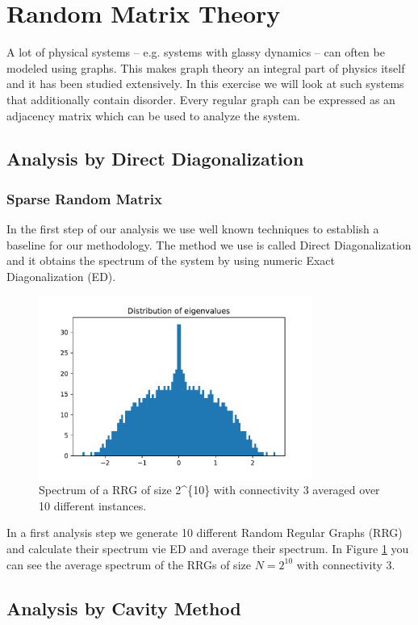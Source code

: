 \documentclass[../main.tex]{subfiles}
\begin{document}
\section{Random Matrix Theory}
A lot of physical systems -- e.g. systems with glassy dynamics -- can often be modeled using graphs.
This makes graph theory an integral part of physics itself and it has been studied extensively.
In this exercise we will look at such systems that additionally contain disorder. 
Every regular graph can be expressed as an adjacency matrix which can be used to analyze the system.
\par

\subsection{Analysis by Direct Diagonalization}

\subsubsection{Sparse Random Matrix}
In the first step of our analysis we use well known techniques to establish a baseline for our methodology.
The method we use is called Direct Diagonalization and it obtains the spectrum of the system by using numeric Exact Diagonalization (ED).
\par 

\begin{figure}[htpb]
    \centering
    \includegraphics[width=0.8\textwidth]{../figures/2_1_1_spectrum_sparse.pdf}
    \caption{Spectrum of a RRG of size \num{2^{10}} with connectivity \num{3} averaged over 10 different instances.}
    \label{fig:spectrum_sparse}
\end{figure}

In a first analysis step we generate \num{10} different Random Regular Graphs (RRG) and calculate their spectrum vie ED and average their spectrum.
In Figure \ref{fig:spectrum_sparse} you can see the average spectrum of the RRGs of size $N = 2^{10}$ with connectivity 3.



\subsection{Analysis by Cavity Method}


\ifSubfilesClassLoaded{
}{
    \newpage
}
\end{document}
